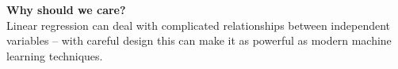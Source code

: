 \documentclass[aspectratio=169]{beamer}
\theoremstyle{principle}
\begin{document}
\begin{frame}

\begin{center}
\Huge\textbf{Why should we care?}\\
\bigskip
\bigskip
\large Linear regression can deal with complicated relationships between independent variables -- with careful design this can make it as powerful as modern machine learning techniques.\\
\end{center}

\end{frame}
\end{document}
